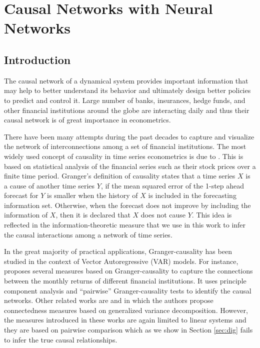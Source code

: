 \chapter{Causal Networks with Neural Networks}

\section{Introduction}\label{S:1}

The causal network of a dynamical system provides important information that may help to better understand its behavior and ultimately design better policies to predict and control it. 
Large number of banks, insurances, hedge funds, and other financial institutions around the globe are interacting daily and thus their causal network is of great importance in econometrics.  

There have been many attempts during the past decades to capture and visualize the network of interconnections among a set of financial institutions. 
The most widely used concept of causality in time series econometrics is due to \citet{granger}. 
This is based on statistical analysis of the financial series such as their stock prices over a finite time period. 
Granger’s definition of causality states that a time series $X$ is a cause of another time series $Y$, if the mean squared error of the 1-step ahead forecast for $Y$ is smaller when the history of $X$ is included in the forecasting information set. 
Otherwise, when the forecast does not improve by including the information of $X$, then it is declared that $X$ does not cause $Y$.
This idea is reflected in the information-theoretic measure that we use in this work to infer the causal interactions among a network of time series.  

In the great majority of practical applications, Granger-causality has been studied in the context of Vector Autoregressive (VAR) models. 
For instance, \citet{billio2012econometric} proposes several measures  based on Granger-causality to capture the connections between the monthly returns of different financial institutions. 
It uses principle component analysis and ``pairwise'' Granger-causality tests to identify the causal networks. 
Other related works are \citet{diebold2014network} and \citet{barigozzi2016network} in which the authors propose connectedness measures based on generalized variance decomposition.
However, the measures introduced in these works are again limited to linear systems and they are based on pairwise comparison which as we show in Section  \ref{sec:dig} fails to infer the true causal relationships.

